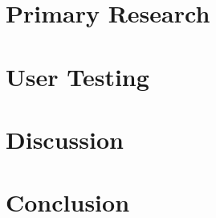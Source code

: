 \documentclass[12pt]{report}
\begin{document}
\pagestyle{plain}					%




\clearpage
\setcounter{page}{2}















%



%



\tableofcontents
\listoffigures
\listoftables

\cleardoublepage
\pagestyle{fancy}				%








\chapter{Primary Research}



\chapter{User Testing}

\chapter{Discussion}

%
\chapter{Conclusion}



\nocite{*}						%
\clearpage





%
\end{document}
